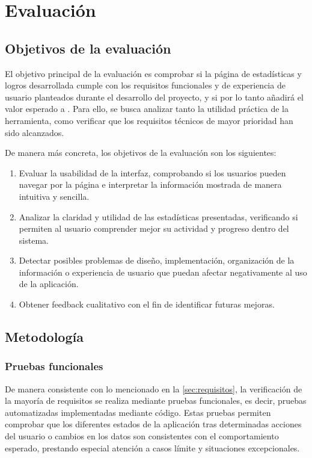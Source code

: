 \chapter{Evaluación}
\label{cap:evaluacion}

\section{Objetivos de la evaluación}

El objetivo principal de la evaluación es comprobar si la página de estadísticas y logros desarrollada cumple con los requisitos funcionales y de experiencia de usuario planteados durante el desarrollo del proyecto, y si por lo tanto añadirá el valor esperado a \aer. Para ello, se busca analizar tanto la utilidad práctica de la herramienta, como verificar que los requisitos técnicos de mayor prioridad han sido alcanzados.

De manera más concreta, los objetivos de la evaluación son los siguientes:

\begin{enumerate}
    \item Evaluar la usabilidad de la interfaz, comprobando si los usuarios pueden navegar por la página e interpretar la información mostrada de manera intuitiva y sencilla.
    \item Analizar la claridad y utilidad de las estadísticas presentadas, verificando si permiten al usuario comprender mejor su actividad y progreso dentro del sistema.
    \item Detectar posibles problemas de diseño, implementación, organización de la información o experiencia de usuario que puedan afectar negativamente al uso de la aplicación.
    \item Obtener feedback cualitativo con el fin de identificar futuras mejoras.
\end{enumerate}


\section{Metodología}

\subsection{Pruebas funcionales}
De manera consistente con lo mencionado en la \autoref{sec:requisitos}, la verificación de la mayoría de requisitos se realiza mediante pruebas funcionales, es decir, pruebas automatizadas implementadas mediante código. Estas pruebas permiten comprobar que los diferentes estados de la aplicación tras determinadas acciones del usuario o cambios en los datos son consistentes con el comportamiento esperado, prestando especial atención a casos límite y situaciones excepcionales.

